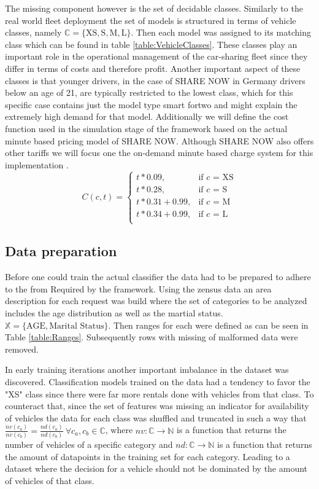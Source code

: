 The missing component however is the set of decidable classes. Similarly to the real world fleet deployment the
set of models is structured in terms of vehicle classes, namely $\mathbb{C} = \{ \text{XS}, \text{S}, \text{M}, \text{L} \}$.
Then each model was assigned to its matching class which can be found in table \ref{table:VehicleClasses}.
These classes play an important role in the operational management of the car-sharing fleet since they differ in terms of costs and therefore profit.
Another important aspect of these classes is that younger drivers, in the case of SHARE NOW in Germany drivers below an age of 21, are typically
restricted to the lowest class, which for this specific case contains just the model type smart fortwo and might explain
the extremely high demand for that model. Additionally we will define the cost function used in the simulation stage
of the framework based on the actual minute based pricing model of SHARE NOW. Although SHARE NOW also offers other tariffs we will focus one
the on-demand minute based charge system for this implementation \cite{ShareNowPricing}.
$$
C(c, t) = \begin{cases}
  t * 0.09, & \text{if $c$ = XS}\\
  t * 0.28, & \text{if $c$ = S}\\
  t * 0.31 + 0.99, & \text{if $c$ = M}\\
  t * 0.34 + 0.99, & \text{if $c$ = L}\\
 \end{cases}
$$

\subsection{Data preparation}
\label{sub_sec:CaseStudy/Preparation}

Before one could train the actual classifier the data had to be prepared to adhere to the from
Required by the framework. Using the zensus data an area description for each request was
build where the set of categories to be analyzed includes the age distribution as well as the martial status.
$\mathbb{X} = \{ \text{AGE}, \text{Marital Status} \}$. Then ranges for each were defined as can be seen in Table \ref{table:Ranges}.
Subsequently rows with missing of malformed data were removed.

In early training iterations another important imbalance in the dataset was discovered. Classification models
trained on the data had a tendency to favor the "XS" class since there were far more rentals done with
vehicles from that class. To counteract that, since the set of features was missing an indicator for availability
of vehicles the data for each class was shuffled and truncated in such a way that
$\frac{nv(c_a)}{nv(c_b)} = \frac{nd(c_a)}{nd(c_b)} \ \forall c_a, c_b \in \mathbb{C}$, where $nv: \mathbb{C} \to \mathbb{N}$ is a function
that returns the number of vehicles of a specific category and $nd: \mathbb{C} \to \mathbb{N}$ is a function that returns the
amount of datapoints in the training set for each category. Leading to a dataset where the decision for a vehicle
should not be dominated by the amount of vehicles of that class.

